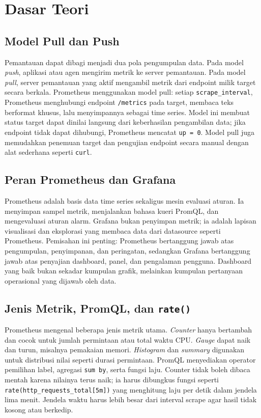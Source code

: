 \documentclass[a4paper,oneside,11pt]{book}
\begin{document}
\chapter{Dasar Teori}

\section{Model Pull dan Push}
Pemantauan dapat dibagi menjadi dua pola pengumpulan data. Pada model \emph{push}, aplikasi atau agen mengirim metrik ke server pemantauan. Pada model \emph{pull}, server pemantauan yang aktif mengambil metrik dari endpoint milik target secara berkala. Prometheus menggunakan model pull: setiap \texttt{scrape\_interval}, Prometheus menghubungi endpoint \texttt{/metrics} pada target, membaca teks berformat khusus, lalu menyimpannya sebagai time series. Model ini membuat status target dapat dinilai langsung dari keberhasilan pengambilan data; jika endpoint tidak dapat dihubungi, Prometheus mencatat \texttt{up = 0}. Model pull juga memudahkan penemuan target dan pengujian endpoint secara manual dengan alat sederhana seperti \texttt{curl}.

\section{Peran Prometheus dan Grafana}
Prometheus adalah basis data time series sekaligus mesin evaluasi aturan. Ia menyimpan sampel metrik, menjalankan bahasa kueri PromQL, dan mengevaluasi aturan alarm. Grafana bukan penyimpan metrik; ia adalah lapisan visualisasi dan eksplorasi yang membaca data dari datasource seperti Prometheus. Pemisahan ini penting: Prometheus bertanggung jawab atas pengumpulan, penyimpanan, dan peringatan, sedangkan Grafana bertanggung jawab atas penyajian dashboard, panel, dan pengalaman pengguna. Dashboard yang baik bukan sekadar kumpulan grafik, melainkan kumpulan pertanyaan operasional yang dijawab oleh data.

\section{Jenis Metrik, PromQL, dan \texttt{rate()}}
Prometheus mengenal beberapa jenis metrik utama. \emph{Counter} hanya bertambah dan cocok untuk jumlah permintaan atau total waktu CPU. \emph{Gauge} dapat naik dan turun, misalnya pemakaian memori. \emph{Histogram} dan \emph{summary} digunakan untuk distribusi nilai seperti durasi permintaan. PromQL menyediakan operator pemilihan label, agregasi \texttt{sum by}, serta fungsi laju. Counter tidak boleh dibaca mentah karena nilainya terus naik; ia harus dibungkus fungsi seperti \texttt{rate(http\_requests\_total[5m])} yang menghitung laju per detik dalam jendela lima menit. Jendela waktu harus lebih besar dari interval scrape agar hasil tidak kosong atau berkedip.
\end{document}
